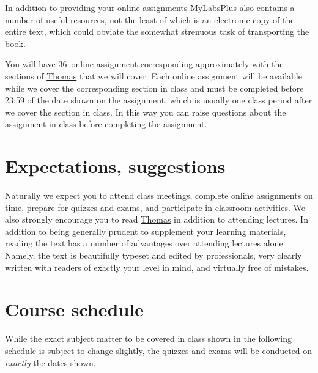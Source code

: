 \documentclass[11pt]{article}
\begin{document}
In addition to providing your online assignments
\href{http://iastate.mylabsplus.com}{MyLabsPlus}
also contains a number of useful resources, not the least of which is an
electronic copy of the entire text, which could obviate
the somewhat strenuous task of transporting the book.

You will have 36~online assignment corresponding
approximately with the sections of 
\href{http://wps.aw.com/aw_thomas_calculus_series}{Thomas}
that we will cover. Each online assignment will be available while we cover the
corresponding section in class and must be completed
before 23:59 of the date shown on the assignment, which
is usually one class period after we cover the section in class.
In this way you can raise questions about
the assignment in class before completing the assignment.

\section{Expectations, suggestions} Naturally we expect you to attend 
class meetings, complete online assignments on 
time, prepare for quizzes and exams, and participate in classroom 
activities. We also strongly encourage you to read
\href{http://wps.aw.com/aw_thomas_calculus_series}{Thomas}
in addition to attending lectures.
In addition to being generally prudent to 
supplement your learning materials, reading the text has a number of 
advantages over attending lectures alone. Namely, the text is beautifully 
typeset and edited by professionals, very clearly written with readers 
of exactly your level in mind, and virtually free of mistakes.

\section{Course schedule}\label{Schedule} While the exact subject
matter to be covered in class shown in the following schedule is
subject to change slightly, the quizzes and exams will be conducted
on {\em exactly} the dates shown.
\end{document}

